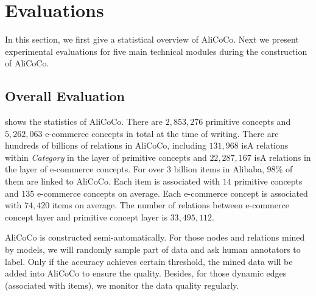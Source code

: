 \section{Evaluations}
\label{sec:eval}
In this section, we first give a statistical overview of AliCoCo.
Next we present experimental evaluations for five main technical modules 
during the construction of AliCoCo.

\subsection{Overall Evaluation}

 shows the statistics of AliCoCo.
There are $2,853,276$ primitive concepts and $5,262,063$ e-commerce concepts in total at the time of writing.
There are hundreds of billions of relations in AliCoCo, including $131,968$ isA relations within \textit{Category} in the layer of primitive concepts and $22,287,167$ isA relations in the layer of e-commerce concepts.
For over $3$ billion items in Alibaba, $98\%$ of them are linked to AliCoCo.
Each item is associated with $14$ primitive concepts and $135$ e-commerce concepts on average.
Each e-commerce concept is associated with $74,420$ items on average.
The number of relations between e-commerce concept layer and primitive concept layer is $33,495,112$.

AliCoCo is constructed semi-automatically.
For those nodes and relations mined by models, 
we will randomly sample part of data and ask human annotators to label.
Only if the accuracy achieves certain threshold,
the mined data will be added into AliCoCo to ensure the quality.
Besides, for those dynamic edges (associated with items),
we monitor the data quality regularly.


